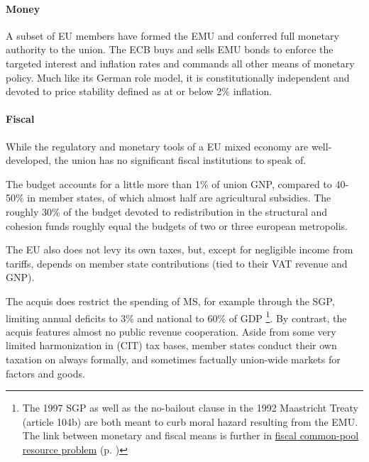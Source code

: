 \documentclass[11pt,a4paper,oneside,openright]{article}
\begin{document}
\paragraph{Money} A subset of \gls{EU} members have formed the \gls{EMU} and conferred full monetary authority to the union. 
The \gls{ECB} buys and sells \gls{EMU} bonds to enforce the targeted interest and inflation rates and commands all other means of monetary policy. 
Much like its German role model, it is constitutionally independent and devoted to price stability defined as at or below 2\% inflation. %

\paragraph{Fiscal} While the regulatory and monetary tools of a \gls{EU} mixed economy are well-developed, the union has no significant fiscal institutions to speak of. 


The budget accounts for a little more than 1\% of union \gls{GNP}, compared to 40-50\% in member states, of which almost half are agricultural subsidies. 
The roughly 30\% of the budget devoted to redistribution in the structural and cohesion funds roughly equal the budgets of two or three european metropolis. %

The \gls{EU} also does not levy its own taxes, but, except for negligible income from tariffs, depends on member state contributions (tied to their \gls{VAT} revenue and \gls{GNP}). 

The acquis does restrict the spending of \gls{MS}, for example through the \gls{SGP}, limiting annual deficits to 3\% and national to 60\% of \gls{GDP}
	\footnote{
		The 1997 \gls{SGP} as well as the no-bailout clause in the 1992 Maastricht Treaty (article 104b) are both meant to curb moral hazard resulting from the \gls{EMU}. 
		The link between monetary and fiscal means is further in \hyperref[sec:fiscal_CPR]{fiscal common-pool resource problem} (p. \pageref{sec:fiscal_CPR})
	}.%
By contrast, the acquis features almost no public revenue cooperation. 
Aside from some very limited harmonization in (\gls{CIT}) tax bases, member states conduct their own taxation on always formally, and sometimes factually union-wide markets for factors and goods.
\end{document}
